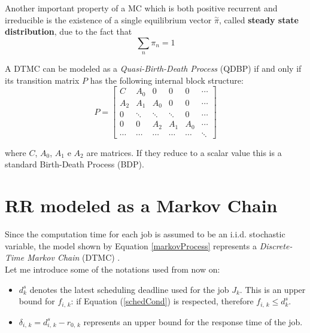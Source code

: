 Another important property of a MC which is both positive recurrent and irreducible is the existence of a single equilibrium vector \( \overset{\sim}{\pi} \), called \textbf{steady state distribution}, due to the fact that
\begin{equation*}
  \displaystyle\sum_{n} \pi_{n} = 1
\end{equation*}

A DTMC can be modeled as a \emph{Quasi-Birth-Death Process} (QDBP) \cite{nummethods} if and only if its transition matrix \( P \) has the following internal block structure:
\begin{equation*} \label{transitionmatrix}
  P = 
  \begin{bmatrix}
    C & A_{0} & 0 & 0 & 0 & \cdots \\
    A_{2} & A_{1} & A_{0} & 0 & 0 & \cdots \\
    0 & \ddots & \ddots & \ddots & 0 & \cdots \\
    0 & 0 & A_{2} & A_{1} & A_{0} & \cdots \\
    \cdots & \cdots & \cdots & \cdots & \cdots & \ddots
  \end{bmatrix}
\end{equation*}

where \( C \), \( A_{0} \), \( A_{1} \) e \( A_{2} \) are matrices. If they reduce to a scalar value this is a standard Birth-Death Process (BDP).

\section{RR modeled as a Markov Chain}
Since the computation time for each job is assumed to be an i.i.d. stochastic variable, the model shown by Equation \ref{markovProcess} represents a \emph{Discrete-Time Markov Chain} (DTMC) \cite{stochasticanalysis}.\\
Let me introduce some of the notations used from now on:
\begin{itemize}
  \item \( d_{k}^{s} \) denotes the latest scheduling deadline used for the job \( J_{k} \). This is an upper bound for \( f_{i,\,k} \): if Equation (\ref{schedCond}) is respected, therefore \( f_{i,\,k} \leq d_{k}^{s} \).
  \item \( \delta_{i,\,k} = d_{i,\,k}^{s} - r_{0,\,k} \) represents an upper bound for the response time of the job.
\end{itemize}

